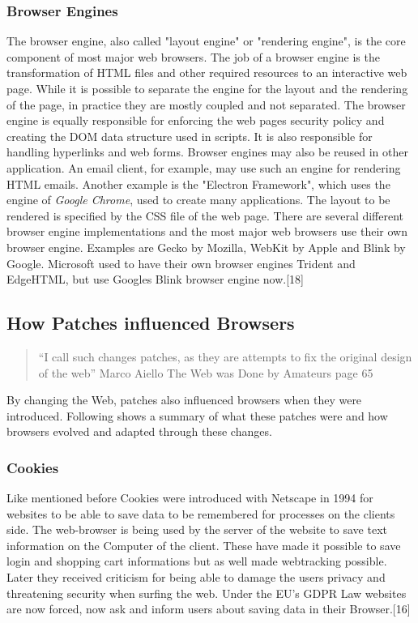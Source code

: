 \documentclass[runningheads]{llncs}
\begin{document}
		\subsubsection{Browser Engines}
		\leavevmode\newline
		The browser engine, also called "layout engine" or "rendering engine", is the core component of most major web browsers. The job of a browser engine is the transformation of HTML files and other required resources to an interactive web page. While it is possible to separate the engine for the layout and the rendering of the page, in practice they are mostly coupled and not separated. The browser engine is equally responsible for enforcing the web pages security policy and creating the DOM data structure used in scripts. It is also responsible for handling hyperlinks and web forms.
		Browser engines may also be reused in other application. An email client, for example, may use such an engine for rendering HTML emails. Another example is the "Electron Framework", which uses the engine of \textit{Google Chrome}, used to create many applications. The layout to be rendered is specified by the CSS file of the web page. There are several different browser engine implementations and the most major web browsers use their own browser engine. Examples are Gecko by Mozilla, WebKit by Apple and Blink by Google. Microsoft used to have their own browser engines Trident and EdgeHTML, but use Googles Blink browser engine now.[18]
		
		\subsection{How Patches influenced Browsers}
			\begin{quote}``I call such changes patches, as they are attempts to fix the original design of the web'' Marco Aiello The Web was Done by Amateurs page 65 \end{quote}
		By changing the Web, patches also influenced browsers when they were introduced. Following shows a summary of what these patches were and how browsers evolved and adapted through these changes.
			\subsubsection{Cookies}
			\leavevmode\newline
			Like mentioned before Cookies were introduced with Netscape in 1994 for websites to be able to save data to be remembered for processes on the clients side. The web-browser is being used by the server of the website to save text information on the Computer of the client. These have made it possible to save login and shopping cart informations but as well made webtracking possible. Later they received criticism for being able to damage the users privacy and threatening security when surfing the web. Under the EU's GDPR Law websites are now forced, now ask and inform users about saving data in their Browser.[16]
\end{document}
